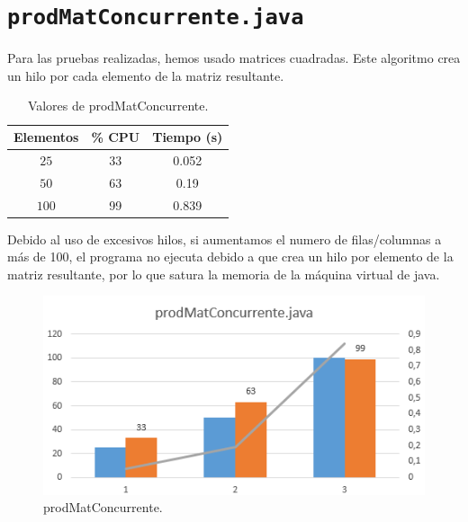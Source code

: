 \documentclass[12pt,letterpaper]{article}
\begin{document}
\section{\texttt{prodMatConcurrente.java}}
\noindent
Para las pruebas realizadas, hemos usado matrices cuadradas. Este algoritmo crea un hilo por cada elemento de la matriz resultante.
\begin{center}
	\begin{table}[htbp]
		\begin{center}
			\begin{tabular}{|c|c|c|}
				\hline
				\textbf{Elementos} & \textbf{\% CPU} & \textbf{Tiempo (s)}  \\
				\hline 
				$25$ & 33 & 0.052\\ \hline
				$50$ & 63 & 0.19\\ \hline
				$100$ & 99 & 0.839\\ \hline	
			\end{tabular}
			\caption{Valores de prodMatConcurrente.}
			\label{tabla:Valores de prodMatConcurrente}
		\end{center}
	\end{table}
\end{center}
\noindent
Debido al uso de excesivos hilos, si aumentamos el numero de filas/columnas a más de 100, el programa no ejecuta debido a que crea un hilo por elemento de la matriz resultante, por lo que satura la memoria de la máquina virtual de java.
\begin{figure}
	\begin{center}
		\includegraphics[scale=1]{prodMatConcurrente.png}
		\caption{prodMatConcurrente.}
		\label{fig: prodMatConcurrente}
	\end{center}	
\end{figure}


\newpage
\end{document}
